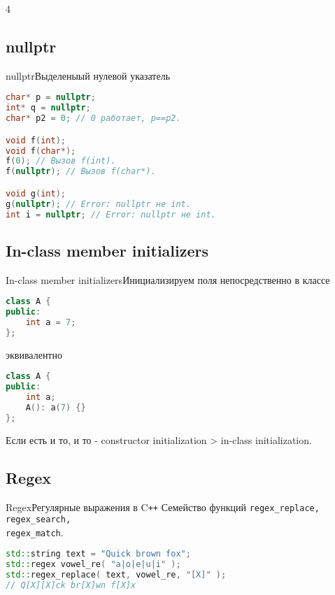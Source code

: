 4\documentclass[10pt]{beamer}
\begin{document}
\subsection{nullptr}
\hypertarget{Nullptr}{}
\begin{frame}[fragile]{nullptr}{Выделеныый нулевой указатель}
\begin{lstlisting}[language=C++]
char* p = nullptr;
int* q = nullptr;
char* p2 = 0; // 0 работает, p==p2.

void f(int);
void f(char*);
f(0); // Вызов f(int).
f(nullptr); // Вызов f(char*).

void g(int);
g(nullptr); // Error: nullptr не int.
int i = nullptr; // Error: nullptr не int.
\end{lstlisting}
\end{frame}

\subsection{In-class member initializers}
\hypertarget{In-class member initializers}{}
\begin{frame}[fragile]{In-class member initializers}{Инициализируем поля непосредственно в классе}
\begin{lstlisting}[language=C++]
class A {
public:
    int a = 7;
};
\end{lstlisting}
эквивалентно
\begin{lstlisting}[language=C++]
class A {
public:
    int a;
    A(): a(7) {}
};
\end{lstlisting}
Если есть и то, и то - constructor initialization > in-class initialization.
\end{frame}

\subsection{Regex}
\hypertarget{Regex}{}
\begin{frame}[fragile]{Regex}{Регулярные выражения в C\texttt{++}}
Семейство функций \texttt{regex\_replace, regex\_search, \\regex\_match}.

\begin{lstlisting}[language=C++]
std::string text = "Quick brown fox";
std::regex vowel_re( "a|o|e|u|i" );
std::regex_replace( text, vowel_re, "[X]" );
// Q[X][X]ck br[X]wn f[X]x
\end{lstlisting}
\end{frame}
\end{document}
